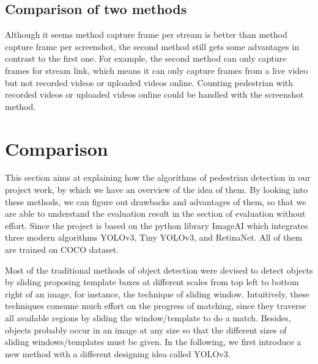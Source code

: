 \documentclass[runningheads]{llncs}
\begin{document}
\subsection{Comparison of two methods}
Although it seems method capture frame per stream is better than method capture frame per screenshot, the second method still gets some advantages in contrast to the first one.  For example, the second method can only capture frames for stream link, which means it can only capture frames from a live video but not recorded videos or uploaded videos online. Counting pedestrian with recorded videos or uploaded videos online could be handled with the screenshot method.

\section{Comparison}
This section aims at explaining how the algorithms of pedestrian detection in our project work, by which we have an overview of the idea of them. By looking into these methods, we can figure out drawbacks and advantages of them, so that we are able to understand the evaluation result in the section of evaluation without effort. Since the project is based on the python library ImageAI which integrates three modern algorithms YOLOv3, Tiny YOLOv3, and RetinaNet. All of them are trained on COCO dataset. 

Most of the traditional methods of object detection were devised to detect objects by sliding proposing template boxes at different scales from top left to bottom right of an image, for instance, the technique of sliding window. Intuitively, these techniques consume much effort on the progress of matching, since they traverse all available regions by sliding the window/template to do a match. Besides, objects probably occur in an image at any size so that the different sizes of sliding windows/templates must be given. In the following, we first introduce a new method with a different designing idea called YOLOv3. 
\end{document}
